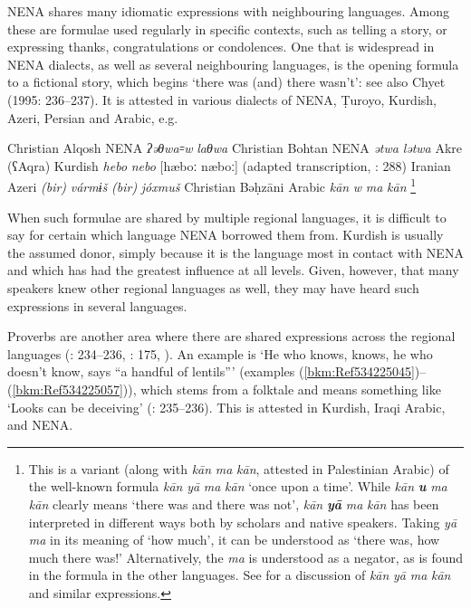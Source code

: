 \documentclass[output=paper]{langsci/langscibook}
\begin{document}
NENA shares many idiomatic expressions with neighbouring languages. Among these are formulae used regularly in specific contexts, such as telling a story, or expressing thanks, congratulations or condolences. One that is widespread in NENA dialects, as well as several neighbouring languages, is the opening formula to a fictional story, which begins ‘there was (and) there wasn’t’: see also Chyet (1995: 236–237). It is attested in various dialects of NENA, Ṭuroyo, Kurdish, Azeri, Persian and Arabic, e.g.

\ea
\ea Christian Alqosh NENA   \textit{ʔəθwa꞊w} \textit{laθwa} \citep[268]{Coghill2009}
\ex Christian Bohtan NENA   \textit{ətwa} \textit{lətwa} \citep{Fox2009}
\ex Akre (ʕAqra) Kurdish   \textit{hebo} \textit{nebo} [hæboː næboː] (adapted transcription, \citealt{MacKenzie1962}: 288) 
\ex Iranian Azeri   \textit{(bir)} \textit{vármɨš} \textit{(bir)} \textit{jóxmuš} \citep[175]{Garbell1965}
\ex Christian Bəḥzāni Arabic   \textit{kān} \textit{w} \textit{ma} \textit{kān} \citep[404]{Jastrow1981}\footnote{This is a variant (along with \textit{kān} \textit{ma} \textit{kān}, attested in Palestinian Arabic) of the well-known formula \textit{kān} \textit{yā} \textit{ma} \textit{kān} ‘once upon a time’. While \textit{kān} \textbf{\textit{u}} \textit{ma} \textit{kān} clearly means ‘there was and there was not’, \textit{kān} \textbf{\textit{yā}} \textit{ma} \textit{kān} has been interpreted in different ways both by scholars and native speakers. Taking \textit{yā} \textit{ma} in its meaning of ‘how much’, it can be understood as ‘there was, how much there was!’ Alternatively, the \textit{ma} is understood as a negator, as is found in the formula in the other languages. See \citet{Lentin1995} for a discussion of \textit{kān} \textit{yā} \textit{ma} \textit{kān} and similar expressions.}
\z
\z

When such formulae are shared by multiple regional languages, it is difficult to say for certain which language NENA borrowed them from. Kurdish is usually the assumed donor, simply because it is the language most in contact with NENA and which has had the greatest influence at all levels. Given, however, that many speakers knew other regional languages as well, they may have heard such expressions in several languages.

Proverbs are another area where there are shared expressions across the regional languages (\citealt{Chyet1995}: 234–236, \citealt{Garbell1965}: 175, \citealt{Segal1955}). An example is ‘He who knows, knows, he who doesn’t know, says “a handful of lentils”’ (examples (\ref{bkm:Ref534225045})–(\ref{bkm:Ref534225057})), which stems from a folktale and means something like ‘Looks can be deceiving’ (\citealt{Chyet1995}: 235–236). This is attested in Kurdish, Iraqi Arabic, and NENA.
\end{document}
